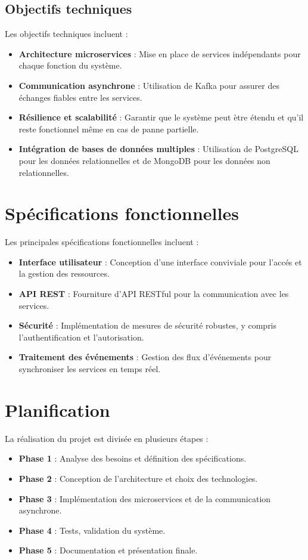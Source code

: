 \documentclass[12pt,a4paper]{report}
\begin{document}
\subsection*{Objectifs techniques}
Les objectifs techniques incluent :
\begin{itemize}
    \item \textbf{Architecture microservices} : Mise en place de services ind\'ependants pour chaque fonction du syst\`eme.
    \item \textbf{Communication asynchrone} : Utilisation de Kafka pour assurer des \'echanges fiables entre les services.
    \item \textbf{R\'esilience et scalabilit\'e} : Garantir que le syst\`eme peut \`etre \'etendu et qu'il reste fonctionnel m\^eme en cas de panne partielle.
    \item \textbf{Int\'egration de bases de donn\'ees multiples} : Utilisation de PostgreSQL pour les donn\'ees relationnelles et de MongoDB pour les donn\'ees non relationnelles.
\end{itemize}

\section{Sp\'ecifications fonctionnelles}
Les principales sp\'ecifications fonctionnelles incluent :
\begin{itemize}
    \item \textbf{Interface utilisateur} : Conception d'une interface conviviale pour l'acc\'es et la gestion des ressources.
    \item \textbf{API REST} : Fourniture d'API RESTful pour la communication avec les services.
    \item \textbf{S\'ecurit\'e} : Impl\'ementation de mesures de s\'ecurit\'e robustes, y compris l'authentification et l'autorisation.
    \item \textbf{Traitement des \'ev\'enements} : Gestion des flux d'\'ev\'enements pour synchroniser les services en temps r\'eel.
\end{itemize}

\section{Planification}
La r\'ealisation du projet est divis\'ee en plusieurs \'etapes :
\begin{itemize}
    \item \textbf{Phase 1} : Analyse des besoins et d\'efinition des sp\'ecifications.
    \item \textbf{Phase 2} : Conception de l'architecture et choix des technologies.
    \item \textbf{Phase 3} : Impl\'ementation des microservices et de la communication asynchrone.
    \item \textbf{Phase 4} : Tests, validation du syst\`eme.
    \item \textbf{Phase 5} : Documentation et pr\'esentation finale.
\end{itemize}
\end{document}
